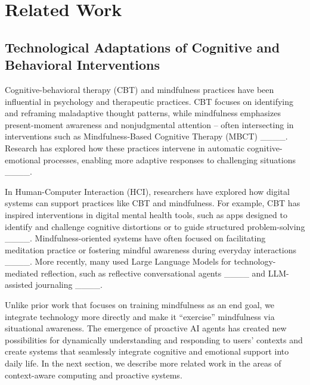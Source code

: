 \section{Related Work}
\subsection{Technological Adaptations of Cognitive and Behavioral Interventions}



Cognitive-behavioral therapy (CBT) and mindfulness practices have been influential in psychology and therapeutic practices. CBT focuses on identifying and reframing maladaptive thought patterns, while mindfulness emphasizes present-moment awareness and nonjudgmental attention – often intersecting in interventions such as Mindfulness-Based Cognitive Therapy (MBCT) ____. Research has explored how these practices intervene in automatic cognitive-emotional processes, enabling more adaptive responses to challenging situations ____.


In Human-Computer Interaction (HCI), researchers have explored how digital systems can support practices like CBT and mindfulness. For example, CBT has inspired interventions in digital mental health tools, such as apps designed to identify and challenge cognitive distortions or to guide structured problem-solving ____. Mindfulness-oriented systems have often focused on facilitating meditation practice or fostering mindful awareness during everyday interactions ____. More recently, many used Large Language Models for technology-mediated reflection, such as reflective conversational agents ____ and LLM-assisted journaling ____. 

Unlike prior work that focuses on training mindfulness as an end goal, we integrate technology more directly and make it ``exercise'' mindfulness via situational awareness. The emergence of proactive AI agents has created new possibilities for dynamically understanding and responding to users’ contexts and create systems that seamlessly integrate cognitive and emotional support into daily life. In the next section, we describe more related work in the areas of context-aware computing and proactive systems.


